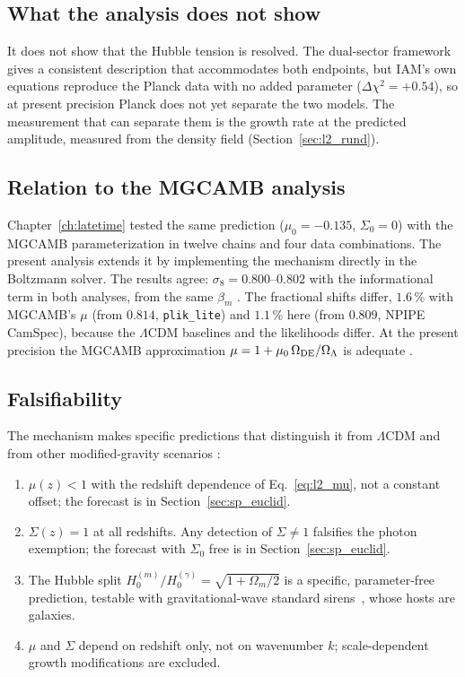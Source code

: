 \subsection{What the analysis does not show}
It does not show that the Hubble tension is resolved. The dual-sector framework gives a consistent description that accommodates both endpoints, but
IAM's own equations reproduce the Planck data with no added parameter ($\Delta\chi^2=+0.54$), so at present precision Planck does not yet separate the two
models. The measurement that can separate them is the growth rate at the predicted amplitude, measured from the density field
(Section~\ref{sec:l2_rund}).

\subsection{Relation to the MGCAMB analysis}
Chapter~\ref{ch:latetime} tested the same prediction ($\mu_0=-0.135$, $\Sigma_0=0$) with the MGCAMB parameterization in twelve chains and four data
combinations. The present analysis extends it by implementing the mechanism directly in the Boltzmann solver. The results agree: $\sigma_8=0.800$--$0.802$
with the informational term in both analyses, from the same $\beta_m$ \measured. The fractional shifts differ, $1.6\,\%$ with MGCAMB's $\mu$ (from
$0.814$, \texttt{plik\_lite}) and $1.1\,\%$ here (from $0.809$, NPIPE CamSpec), because the $\Lambda$CDM baselines and the likelihoods differ. At the
present precision the MGCAMB approximation $\mu=1+\mu_0\,\Omega_{\rm DE}/\Omega_\Lambda$ is adequate \interp.

\subsection{Falsifiability}
The mechanism makes specific predictions that distinguish it from $\Lambda$CDM and from other modified-gravity scenarios \prediction:
\begin{enumerate}
\item $\mu(z)<1$ with the redshift dependence of Eq.~\eqref{eq:l2_mu}, not a constant offset; the forecast is in
Section~\ref{sec:sp_euclid}.
\item $\Sigma(z)=1$ at all redshifts. Any detection of $\Sigma\neq1$ falsifies the photon exemption; the forecast with $\Sigma_0$ free is in
Section~\ref{sec:sp_euclid}.
\item The Hubble split $H_0^{(m)}/H_0^{(\gamma)}=\sqrt{1+\Omega_m/2}$ is a specific, parameter-free prediction, testable with gravitational-wave
standard sirens~\cite{Abbott2017Siren}, whose hosts are galaxies.
\item $\mu$ and $\Sigma$ depend on redshift only, not on wavenumber $k$; scale-dependent growth modifications are excluded.
\end{enumerate}

